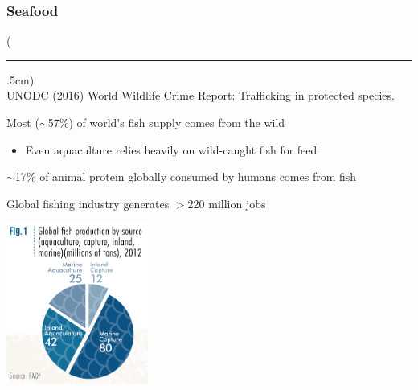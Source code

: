 \documentclass[10pt]{beamer}
\newenvironment{reference}[2]{%
	\begin{textblock*}{\textwidth}(#1,#2)
		\tiny\bgroup\color{gray}}{\egroup\end{textblock*}}
\begin{document}
\begin{frame}[t]
\frametitle{Seafood}
\vspace{0.5cm}

	\begin{reference}{4mm}{92mm}
		\rule{1.5cm}{0.25pt}\\
		UNODC (2016) World Wildlife Crime Report: Trafficking in protected species.
	\end{reference}

	Most ($\sim$57\%) of world's fish supply comes from the wild
		\begin{itemize}
			\item Even aquaculture relies heavily on wild-caught fish for feed
		\end{itemize}
	
	\vspace{0.5cm}
	
	$\sim$17\% of animal protein globally consumed by humans comes from fish
	
	\vspace{0.5cm}
	
	Global fishing industry generates $>$220 million jobs	
	
	\vspace{0.25cm}
	
	\begin{center}
		\includegraphics[width=0.35\textwidth]{figures/fisheries.png}
	\end{center}
\end{frame}
\end{document}
